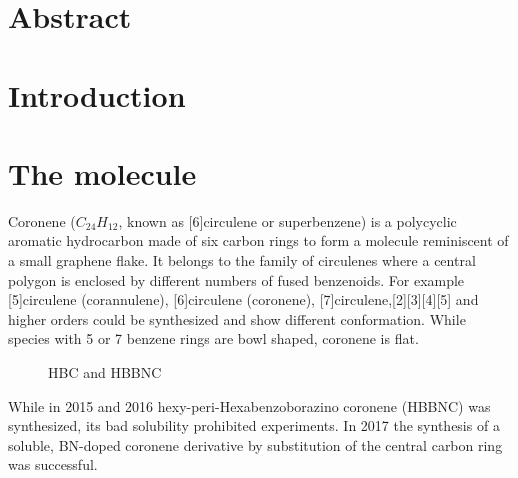 \label{section:HBBNC}
\label{section:HBC}
\section{Abstract}
\section{Introduction}
\section{The molecule}
Coronene ($C_{24}H_{12}$, known as [6]circulene or superbenzene) is a polycyclic aromatic hydrocarbon made of six carbon rings to form a molecule reminiscent of a small graphene flake. It belongs to the family of circulenes where a central polygon is enclosed by different numbers of fused benzenoids. For example [5]circulene (corannulene), [6]circulene (coronene), [7]circulene,[2][3][4][5] and higher orders could be synthesized and show different conformation. While species with 5 or 7 benzene rings are bowl shaped, coronene is flat.

\begin{figure}[h!]\centering
	 \quad
	\caption{ HBC and  HBBNC}
	\label{fig:HBBNC+HBC}
\end{figure}

While in 2015\cite{Krieg_construction_2015} and 2016 \cite{Ciccullo_Quasi-Free-Standing_2016} hexy-peri-Hexabenzoborazino coronene (HBBNC) was synthesized, its bad solubility prohibited experiments. In 2017 the synthesis \cite{dosso_synthesis_2017} of a soluble, BN-doped coronene derivative by substitution of the central carbon ring was successful. 

